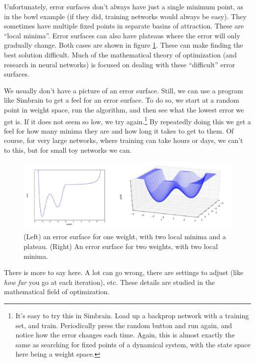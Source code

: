 Unfortunately, error surfaces don't always have just a single minimum point, as in the bowl example (if they did, training networks would always be easy). They sometimes have multiple fixed points in separate basins of attraction. These are ``local minima''. Error surfaces can also have plateaus where the error will only gradually change. Both cases are shown in figure \ref{local_minima}. These can make finding the best solution difficult. Much of the mathematical theory of optimization (and  research in neural networks) is focused on dealing with these ``difficult'' error surfaces.

We usually don't have a picture of an error surface. Still, we can use a program like Simbrain to get a feel for an error surface. To do so, we start at a random point in weight space, run the algorithm, and then see what the lowest error we get is. If it does not seem so low, we try again.\footnote{It's easy to try this in Simbrain. Load up a backprop network with a training set, and train. Periodically press the random button and run again, and notice how the error changes each time. Again, this is almost exactly the same as searching for fixed points of a dynamical system,  with the state space here being a weight space.} By repeatedly doing this we get a feel for how many minima they are and how long it takes to get to them. Of course, for very  large networks, where training can take hours or days, we can't to this, but for small toy networks we can.

\begin{figure}[h]
\centering
\includegraphics[scale=.4]{./images/LocalMinima1d2d.png}
\caption[Jeff Yoshimi and Scott Hotton.]{(Left) an error surface for one weight, with two local minima and a plateau. (Right) An error surface for two weights, with two local minima.}
\label{local_minima}
\end{figure}

 There is more to say here. A lot can go wrong, there are settings to adjust (like \emph{how far} you go at each iteration), etc. These details are studied in the mathematical field of optimization. 
 
